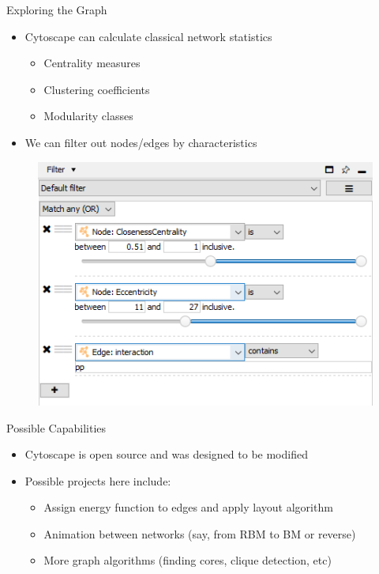 \documentclass{beamer}
\begin{document}
\begin{frame}{Exploring the Graph}
  \begin{itemize}
    \item Cytoscape can calculate classical network statistics
    \begin{itemize}
      \item Centrality measures
      \item Clustering coefficients
      \item Modularity classes
    \end{itemize}
    \item We can filter out nodes/edges by characteristics
  \end{itemize}
  \begin{figure}
    \begin{center}
      \includegraphics[width=.65\textwidth]{cytofilter.png}
    \end{center}
  \end{figure}
\end{frame}

\begin{frame}{Possible Capabilities}
  \begin{itemize}
    \item Cytoscape is open source and was designed to be modified
    \item Possible projects here include:
    \begin{itemize}
      \item Assign energy function to edges and apply layout algorithm
      \item Animation between networks (say, from RBM to BM or reverse)
      \item More graph algorithms (finding cores, clique detection, etc)
    \end{itemize}
  \end{itemize}
  
\end{frame}
\end{document}
